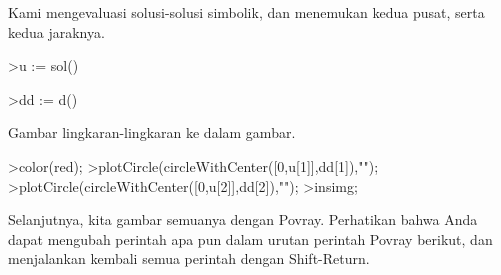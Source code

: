 \documentclass[12pt,arial,letterpaper]{book}
\begin{document}
\begin{eulercomment}
\begin{eulercomment}
\begin{eulercomment}
\begin{eulercomment}
\begin{eulercomment}
\begin{eulercomment}
\begin{eulercomment}
\begin{eulercomment}
\begin{eulercomment}
\begin{eulercomment}
\begin{eulercomment}
\begin{eulercomment}
\begin{eulercomment}
\begin{eulercomment}
\begin{eulercomment}
\begin{eulercomment}
\begin{eulercomment}
\begin{eulercomment}
\begin{eulercomment}
\begin{eulercomment}
\begin{eulercomment}
\begin{eulercomment}
\begin{eulercomment}
\begin{eulercomment}
\begin{eulercomment}
\begin{eulercomment}
\begin{eulercomment}
\begin{eulercomment}
\begin{eulercomment}
\begin{eulercomment}
\begin{eulercomment}
Kami mengevaluasi solusi-solusi simbolik, dan menemukan kedua pusat,
serta kedua jaraknya.
\end{eulercomment}
\begin{eulerprompt}
>u := sol()
\end{eulerprompt}
\begin{euleroutput}
  [0.333333,  1]
\end{euleroutput}
\begin{eulerprompt}
>dd := d()
\end{eulerprompt}
\begin{euleroutput}
  [0.149071,  0.447214]
\end{euleroutput}
\begin{eulercomment}
Gambar lingkaran-lingkaran ke dalam gambar.
\end{eulercomment}
\begin{eulerprompt}
>color(red);
>plotCircle(circleWithCenter([0,u[1]],dd[1]),"");
>plotCircle(circleWithCenter([0,u[2]],dd[2]),"");
>insimg;
\end{eulerprompt}
\begin{eulercomment}
Selanjutnya, kita gambar semuanya dengan Povray. Perhatikan bahwa Anda
dapat mengubah perintah apa pun dalam urutan perintah Povray berikut,
dan menjalankan kembali semua perintah dengan Shift-Return.


\end{eulercomment}
\end{eulercomment}
\end{eulercomment}
\end{eulercomment}
\end{eulercomment}
\end{eulercomment}
\end{eulercomment}
\end{eulercomment}
\end{eulercomment}
\end{eulercomment}
\end{eulercomment}
\end{eulercomment}
\end{eulercomment}
\end{eulercomment}
\end{eulercomment}
\end{eulercomment}
\end{eulercomment}
\end{eulercomment}
\end{eulercomment}
\end{eulercomment}
\end{eulercomment}
\end{eulercomment}
\end{eulercomment}
\end{eulercomment}
\end{eulercomment}
\end{eulercomment}
\end{eulercomment}
\end{eulercomment}
\end{eulercomment}
\end{eulercomment}
\end{eulercomment}
\end{document}
